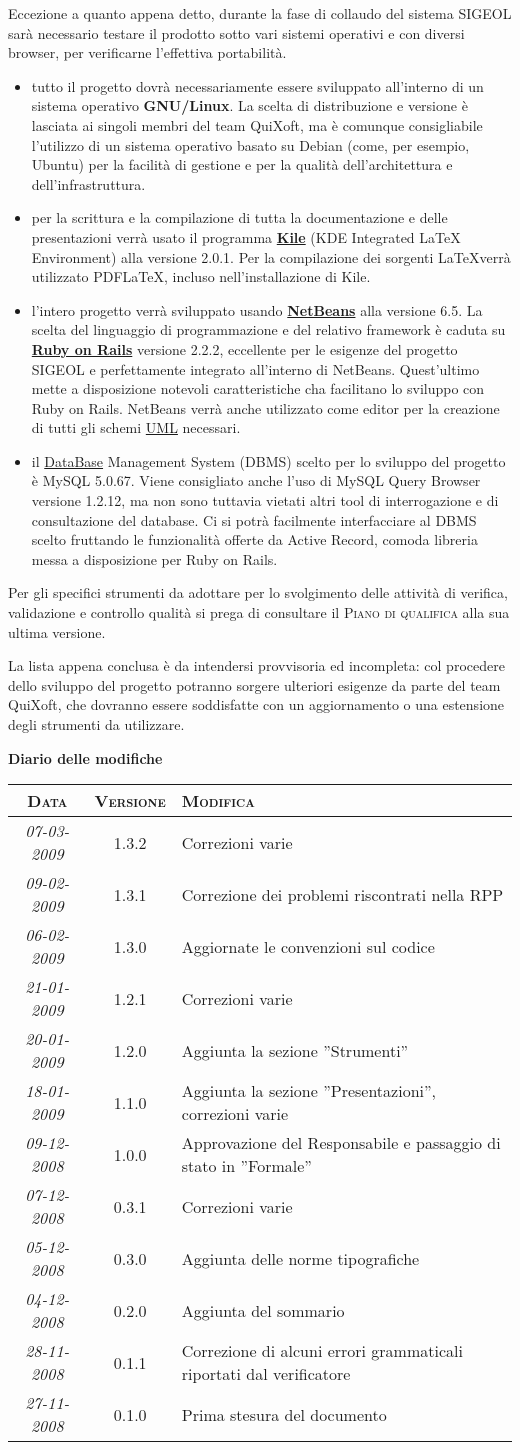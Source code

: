 \documentclass[11pt,a4paper]{article}
\newcommand{\modifiche} 
{
\newpage
\begin{center}
\textbf{Diario delle modifiche} \\
\bigskip
\begin{tabular}{|c|c|p{0.62\textwidth}|}
\hline
\textsc{Data} & \textsc{Versione} & \textsc{Modifica} \\
\hline
\hline
\textit{07-03-2009} & 1.3.2 & Correzioni varie\\
\hline
\textit{09-02-2009} & 1.3.1 & Correzione dei problemi riscontrati nella RPP\\
\hline
\textit{06-02-2009} & 1.3.0 & Aggiornate le convenzioni sul codice\\
\hline
\textit{21-01-2009} & 1.2.1 & Correzioni varie\\
\hline
\textit{20-01-2009} & 1.2.0 & Aggiunta la sezione ''Strumenti''\\
\hline
\textit{18-01-2009} & 1.1.0 & Aggiunta la sezione ''Presentazioni'', correzioni varie\\
\hline
\textit{09-12-2008} & 1.0.0 & Approvazione del Responsabile e passaggio di stato in ''Formale''\\
\hline
\textit{07-12-2008} & 0.3.1 & Correzioni varie \\
\hline
\textit{05-12-2008} & 0.3.0 & Aggiunta delle norme tipografiche \\
\hline
\textit{04-12-2008} & 0.2.0 & Aggiunta del sommario \\
\hline
\textit{28-11-2008} & 0.1.1 & Correzione di alcuni errori grammaticali riportati dal verificatore \\
\hline
\textit{27-11-2008} & 0.1.0 & Prima stesura del documento \\
\hline
\end{tabular}
\end{center}
}
\begin{document}
Eccezione a quanto appena detto, durante la fase di collaudo del sistema SIGEOL sarà necessario testare il prodotto sotto vari sistemi operativi e con diversi browser, per verificarne l'effettiva portabilità.
\begin{itemize}
 \item tutto il progetto dovrà necessariamente essere sviluppato all'interno di un sistema operativo \textbf{GNU/Linux}. La scelta di distribuzione e versione è lasciata ai singoli membri del team QuiXoft, ma è comunque consigliabile l'utilizzo di un sistema operativo basato su Debian (come, per esempio, Ubuntu) per la facilità di gestione e per la qualità dell'architettura e dell'infrastruttura.
 \item per la scrittura e la compilazione di tutta la documentazione e delle presentazioni verrà usato il programma \textbf{\underline{Kile}} (KDE Integrated LaTeX Environment) alla versione 2.0.1. Per la compilazione dei sorgenti \LaTeX \space verrà utilizzato PDFLaTeX, incluso nell'installazione di Kile.
 \item l'intero progetto verrà sviluppato usando \textbf{\underline{NetBeans}} alla versione 6.5. La scelta del linguaggio di programmazione e del relativo framework è caduta su \textbf{\underline{Ruby on Rails}} versione 2.2.2, eccellente per le esigenze del progetto SIGEOL e perfettamente integrato all'interno di NetBeans. Quest'ultimo mette a disposizione notevoli caratteristiche cha facilitano lo sviluppo con Ruby on Rails.
NetBeans verrà anche utilizzato come editor per la creazione di tutti gli schemi \underline{UML} necessari.
\item il \underline{DataBase} Management System (DBMS) scelto per lo sviluppo del progetto è MySQL 5.0.67. Viene consigliato anche l'uso di MySQL Query Browser versione 1.2.12, ma non sono tuttavia vietati altri tool di interrogazione e di consultazione del database.
Ci si potrà facilmente interfacciare al DBMS scelto fruttando le funzionalità offerte da Active Record, comoda libreria messa a disposizione per Ruby on Rails.
\end{itemize}

Per gli specifici strumenti da adottare per lo svolgimento delle attività di verifica, validazione e controllo qualità si prega di consultare il \textsc{Piano di qualifica} alla sua ultima versione.

La lista appena conclusa è da intendersi provvisoria ed incompleta: col procedere dello sviluppo del progetto potranno sorgere ulteriori esigenze da parte del team QuiXoft, che dovranno essere soddisfatte con un aggiornamento o una estensione degli strumenti da utilizzare.


\modifiche
\end{document}
